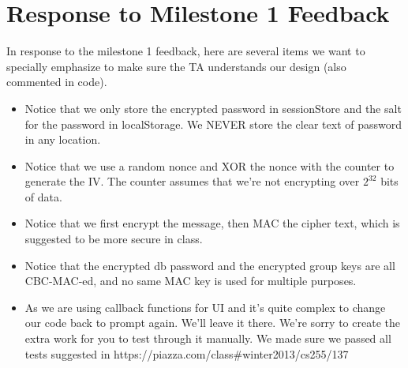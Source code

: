 
\usepackage{graphicx,amssymb,amsmath,enumerate}
\usepackage{courier}
\usepackage{color}
\usepackage{listings}
\usepackage{fancyvrb}
\usepackage{stmaryrd}

\oddsidemargin 0in
\evensidemargin 0in
\textwidth 6.5in
\topmargin -0.5in
\textheight 9.0in




\pagestyle{myheadings}  %

\section{Response to Milestone 1 Feedback}
In response to the milestone 1 feedback, here are several items we want to specially emphasize to make sure the TA understands our design (also commented in code).

\begin{itemize}
\item Notice that we only store the encrypted password in sessionStore and the salt for the password in localStorage. We NEVER store the clear text of password in any location.
\item Notice that we use a random nonce and XOR the nonce with the counter to generate the IV. The counter assumes that we're not encrypting over $2^{32}$ bits of data.
\item Notice that we first encrypt the message, then MAC the cipher text, which is suggested to be more secure in class.
\item Notice that the encrypted db password and the encrypted group keys are all CBC-MAC-ed, and no same MAC key is used for multiple purposes.
\item As we are using callback functions for UI and it's quite complex to change our code back to prompt again. We'll leave it there. We're sorry to create the extra work for you to test through it manually. We made sure we passed all tests suggested in https://piazza.com/class\#winter2013/cs255/137 
\end{itemize}

